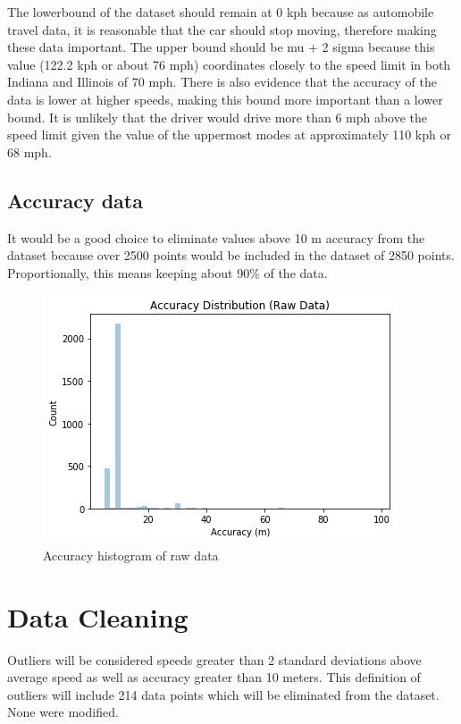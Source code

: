 \documentclass[12pt]{article}
\begin{document}
The lowerbound of the dataset should remain at 0 kph because as automobile travel data, it is reasonable that the car should stop moving, therefore making these data important. The upper bound should be mu + 2 sigma because this value (122.2 kph or about 76 mph) coordinates closely to the speed limit in both Indiana and Illinois of 70 mph. There is also evidence that the accuracy of the data is lower at higher speeds, making this bound more important than a lower bound. It is unlikely that the driver would drive more than 6 mph above the speed limit given the value of the uppermost modes at approximately 110 kph or 68 mph. 

\subsection{Accuracy data}

It would be a good choice to eliminate values above 10 m accuracy from the dataset 
because over 2500 points would be included in the dataset of 2850 points. Proportionally,
this means keeping about 90\% of the data.


\begin{figure}
	\centering
\includegraphics[scale= 1.0]{accuracy_hist.png}
\caption{Accuracy histogram of raw data}
\label{mg:screenshot}
\end{figure}

\section{Data Cleaning}

Outliers will be considered speeds greater than 2 standard deviations above average speed as well as accuracy greater than 10 meters. This definition of outliers will include 214 data points which will be eliminated from the dataset. None were modified. 
\end{document}
